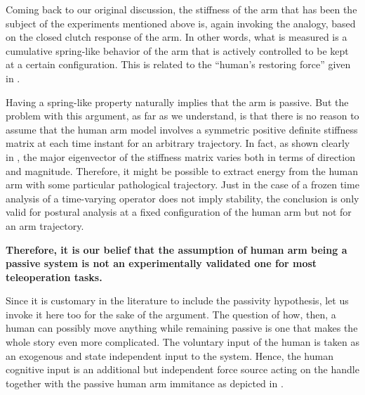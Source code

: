 Coming back to our original discussion, the stiffness of the arm that has been the subject of the experiments mentioned 
above is, again invoking the analogy, based on the closed clutch response of the arm. In other words, what is measured 
is a cumulative spring-like behavior of the arm that is actively controlled to be kept at a certain configuration. This 
is related to the \enquote{human's restoring force} given in . 

Having a spring-like property naturally implies that the arm is passive. But the problem with this argument, as far as 
we understand, is that there is no reason to assume that the human arm model involves a symmetric positive definite 
stiffness matrix at each time instant for an arbitrary trajectory. In fact, as shown clearly in \cite{mussa85}, the major eigenvector 
of the stiffness matrix varies both in terms of direction and magnitude. Therefore, it might be possible to extract energy 
from the human arm with some particular pathological trajectory. Just in the case of a frozen time analysis of a time-varying 
operator does not imply stability, the conclusion is only valid for postural analysis at a fixed configuration of the human arm 
but not for an arm trajectory. 

\textbf{Therefore, it is our belief that the assumption of human arm being a passive system is not an experimentally validated one 
for most teleoperation tasks.}
 


Since it is customary in the literature to include the passivity hypothesis, let us invoke it here too for the sake of the argument. 
The question of how, then, a human can possibly move anything while remaining passive is one that makes the whole story even more 
complicated. The voluntary input of the human is taken as an exogenous and state independent input to the system. Hence, the human 
cognitive input is an additional but independent force source acting on the handle together with the passive human arm immitance 
as depicted in .

